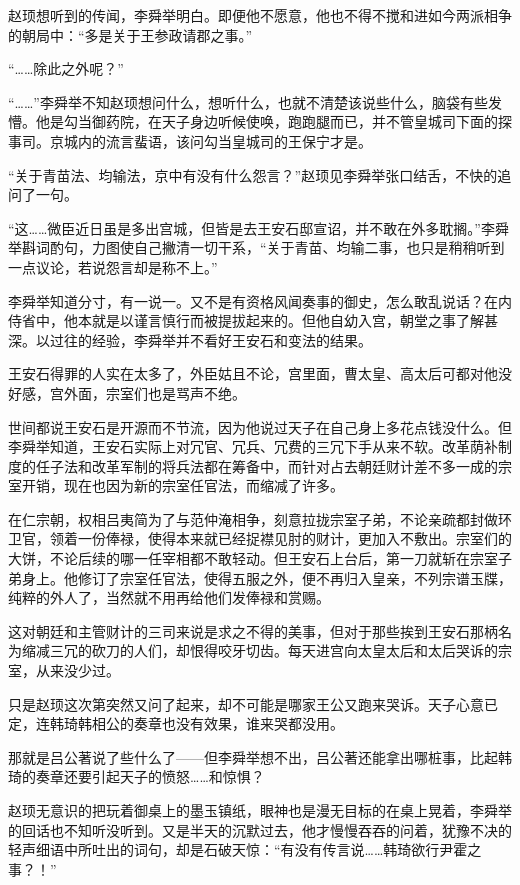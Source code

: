 赵顼想听到的传闻，李舜举明白。即便他不愿意，他也不得不搅和进如今两派相争的朝局中：“多是关于王参政请郡之事。”

“……除此之外呢？”

“……”李舜举不知赵顼想问什么，想听什么，也就不清楚该说些什么，脑袋有些发懵。他是勾当御药院，在天子身边听候使唤，跑跑腿而已，并不管皇城司下面的探事司。京城内的流言蜚语，该问勾当皇城司的王保宁才是。

“关于青苗法、均输法，京中有没有什么怨言？”赵顼见李舜举张口结舌，不快的追问了一句。

“这……微臣近日虽是多出宫城，但皆是去王安石邸宣诏，并不敢在外多耽搁。”李舜举斟词酌句，力图使自己撇清一切干系，“关于青苗、均输二事，也只是稍稍听到一点议论，若说怨言却是称不上。”

李舜举知道分寸，有一说一。又不是有资格风闻奏事的御史，怎么敢乱说话？在内侍省中，他本就是以谨言慎行而被提拔起来的。但他自幼入宫，朝堂之事了解甚深。以过往的经验，李舜举并不看好王安石和变法的结果。

王安石得罪的人实在太多了，外臣姑且不论，宫里面，曹太皇、高太后可都对他没好感，宫外面，宗室们也是骂声不绝。

世间都说王安石是开源而不节流，因为他说过天子在自己身上多花点钱没什么。但李舜举知道，王安石实际上对冗官、冗兵、冗费的三冗下手从来不软。改革荫补制度的任子法和改革军制的将兵法都在筹备中，而针对占去朝廷财计差不多一成的宗室开销，现在也因为新的宗室任官法，而缩减了许多。

在仁宗朝，权相吕夷简为了与范仲淹相争，刻意拉拢宗室子弟，不论亲疏都封做环卫官，领着一份俸禄，使得本来就已经捉襟见肘的财计，更加入不敷出。宗室们的大饼，不论后续的哪一任宰相都不敢轻动。但王安石上台后，第一刀就斩在宗室子弟身上。他修订了宗室任官法，使得五服之外，便不再归入皇亲，不列宗谱玉牒，纯粹的外人了，当然就不用再给他们发俸禄和赏赐。

这对朝廷和主管财计的三司来说是求之不得的美事，但对于那些挨到王安石那柄名为缩减三冗的砍刀的人们，却恨得咬牙切齿。每天进宫向太皇太后和太后哭诉的宗室，从来没少过。

只是赵顼这次第突然又问了起来，却不可能是哪家王公又跑来哭诉。天子心意已定，连韩琦韩相公的奏章也没有效果，谁来哭都没用。

那就是吕公著说了些什么了——但李舜举想不出，吕公著还能拿出哪桩事，比起韩琦的奏章还要引起天子的愤怒……和惊惧？

赵顼无意识的把玩着御桌上的墨玉镇纸，眼神也是漫无目标的在桌上晃着，李舜举的回话也不知听没听到。又是半天的沉默过去，他才慢慢吞吞的问着，犹豫不决的轻声细语中所吐出的词句，却是石破天惊：“有没有传言说……韩琦欲行尹霍之事？！”

